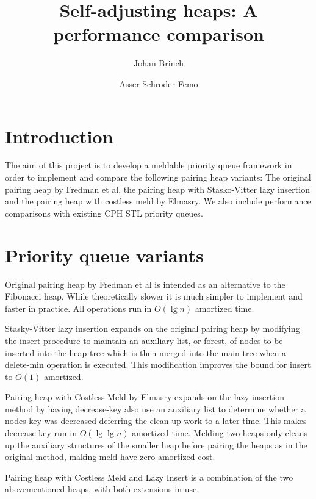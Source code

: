 \documentclass{DIKU-article}[2010/01/13]
\title{Self-adjusting heaps: A performance comparison}
\author{%
Johan Brinch
\and
Asser Schroder Femo
}
\institute{%
Department of Computing, University of Copenhagen\\
Universitetsparken 1, DK-2100 Copenhagen East, Denmark\\
\email{...@diku.dk}
\and
\email{asser@diku.dk}%
}
\begin{document}
\maketitle

\begin{abstract}
\end{abstract}

\begin{subject}
\end{subject}

\section{Introduction}

The aim of this project is to develop a meldable priority queue framework in
order to implement and compare the following pairing heap variants: The original
pairing heap by Fredman et al, the pairing heap with Stasko-Vitter lazy insertion and
the pairing heap with costless meld by Elmasry. We also include performance
comparisons with existing CPH STL priority queues.

\section{Priority queue variants}

\begin{description}
\item{Original pairing heap} by Fredman et al\cite{fredman} is intended as an
alternative to the Fibonacci heap. While theoretically slower it is much simpler 
to implement and faster in practice. All operations run in $O(\lg n)$ amortized time.

\item{Stasky-Vitter lazy insertion} expands on the original pairing heap by
modifying the insert procedure to maintain an auxiliary list, or forest, of
nodes to be inserted into the heap tree which is then merged into the main tree
when a delete-min operation is executed. This modification improves the bound
for insert to $O(1)$ amortized.

\item{Pairing heap with Costless Meld} by Elmasry\cite{costlessmeld} expands on
the lazy insertion method by having decrease-key also use an auxiliary list to
determine whether a nodes key was decreased deferring the clean-up work to a
later time. This makes decrease-key run in $O(\lg \lg n)$ amortized time.
Melding two heaps only cleans up the auxiliary structures of the smaller heap
before pairing the heaps as in the original method, making meld have zero
amortized cost.

\item{Pairing heap with Costless Meld and Lazy Insert} is a combination of the
two abovementioned heaps, with both extensions in use.
\end{description}
\end{document}
